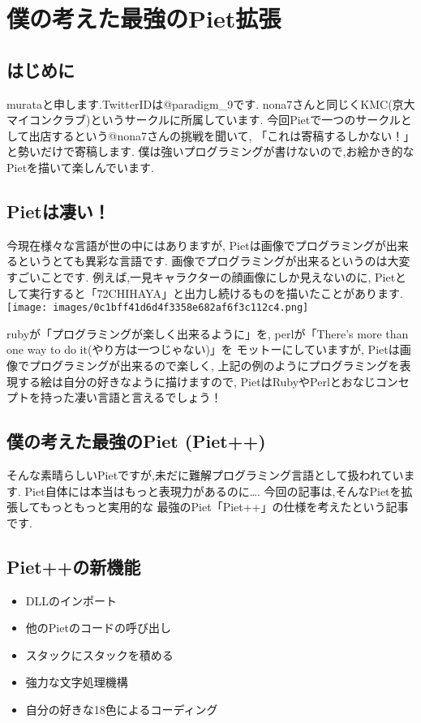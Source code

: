 \section{僕の考えた最強のPiet拡張}

\subsection{はじめに}

murataと申します.TwitterIDは@paradigm\_9です.
nona7さんと同じくKMC(京大マイコンクラブ)というサークルに所属しています.
今回Pietで一つのサークルとして出店するという@nona7さんの挑戦を聞いて,
「これは寄稿するしかない！」と勢いだけで寄稿します.
僕は強いプログラミングが書けないので,お絵かき的なPietを描いて楽しんでいます.

\subsection{Pietは凄い！}

今現在様々な言語が世の中にはありますが,
Pietは画像でプログラミングが出来るというとても異彩な言語です.
画像でプログラミングが出来るというのは大変すごいことです.
例えば,一見キャラクターの顔画像にしか見えないのに,
Pietとして実行すると「72CHIHAYA」と出力し続けるものを描いたことがあります.\\\texttt{[image: images/0c1bff41d6d4f3358e682af6f3c112c4.png]}

rubyが「プログラミングが楽しく出来るように」を, perlが「There's more
than one way to do it(やり方は一つじゃない)」を モットーにしていますが,
Pietは画像でプログラミングが出来るので楽しく,
上記の例のようにプログラミングを表現する絵は自分の好きなように描けますので,
PietはRubyやPerlとおなじコンセプトを持った凄い言語と言えるでしょう！

\subsection{僕の考えた最強のPiet (Piet++)}

そんな素晴らしいPietですが,未だに難解プログラミング言語として扱われています.
Piet自体には本当はもっと表現力があるのに\ldots{}.
今回の記事は,そんなPietを拡張してもっともっと実用的な
最強のPiet「Piet++」の仕様を考えたという記事です.

\subsection{Piet++の新機能}

\begin{itemize}
\item
  DLLのインポート
\item
  他のPietのコードの呼び出し
\item
  スタックにスタックを積める
\item
  強力な文字処理機構
\item
  自分の好きな18色によるコーディング
\end{itemize}

